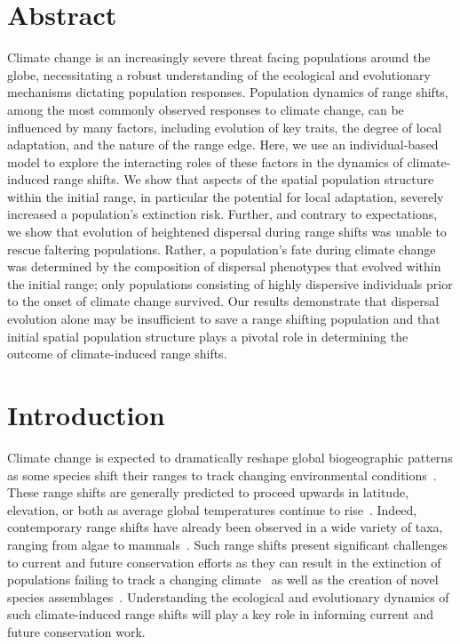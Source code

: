 \documentclass[11pt]{article}
\begin{document}
\section*{Abstract}
Climate change is an increasingly severe threat facing populations around the globe, necessitating a robust understanding of the ecological and evolutionary mechanisms dictating population responses. Population dynamics of range shifts, among the most commonly observed responses to climate change, can be influenced by many factors, including evolution of key traits, the degree of local adaptation, and the nature of the range edge. Here, we use an individual-based model to explore the interacting roles of these factors in the dynamics of climate-induced range shifts. We show that aspects of the spatial population structure within the initial range, in particular the potential for local adaptation, severely increased a population's extinction risk. Further, and contrary to expectations, we show that evolution of heightened dispersal during range shifts was unable to rescue faltering populations. Rather, a population's fate during climate change was determined by the composition of dispersal phenotypes that evolved within the initial range; only populations consisting of highly dispersive individuals prior to the onset of climate change survived. Our results demonstrate that dispersal evolution alone may be insufficient to save a range shifting population and that initial spatial population structure plays a pivotal role in determining the outcome of climate-induced range shifts.

\newpage{}

\section*{Introduction}
Climate change is expected to dramatically reshape global biogeographic patterns as some species shift their ranges to track changing environmental conditions~\citep{gonzalez2010global}. These range shifts are generally predicted to proceed upwards in latitude, elevation, or both as average global temperatures continue to rise~\citep{loarie2009velocity}. Indeed, contemporary range shifts have already been observed in a wide variety of taxa, ranging from algae to mammals~\citep{chen2011rapid, parmesan2006ecological}. Such range shifts present significant challenges to current and future conservation efforts as they can result in the extinction of populations failing to track a changing climate~\citep{parmesan2006ecological} as well as the creation of novel species assemblages~\citep{hobbs2009novel}. Understanding the ecological and evolutionary dynamics of such climate-induced range shifts will play a key role in informing current and future conservation work.
\end{document}

